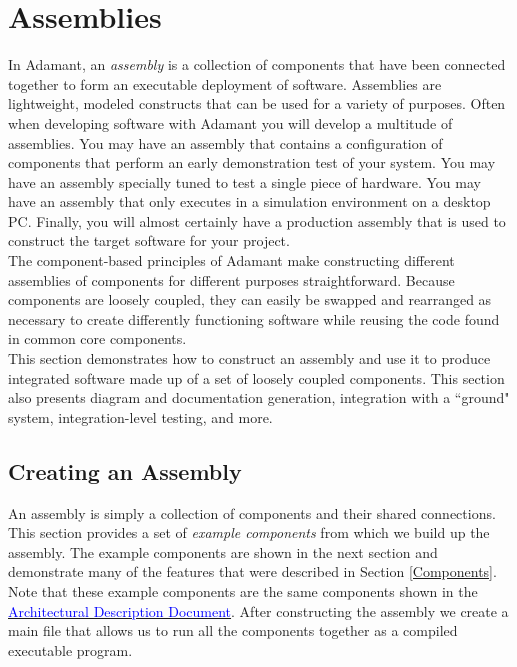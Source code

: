 \newpage
\section{Assemblies} \label{Assemblies}

In Adamant, an \textit{assembly} is a collection of components that have been connected together to form an executable deployment of software. Assemblies are lightweight, modeled constructs that can be used for a variety of purposes. Often when developing software with Adamant you will develop a multitude of assemblies. You may have an assembly that contains a configuration of components that perform an early demonstration test of your system. You may have an assembly specially tuned to test a single piece of hardware. You may have an assembly that only executes in a simulation environment on a desktop PC. Finally, you will almost certainly have a production assembly that is used to construct the target software for your project. \\

The component-based principles of Adamant make constructing different assemblies of components for different purposes straightforward. Because components are loosely coupled, they can easily be swapped and rearranged as necessary to create differently functioning software while reusing the code found in common core components. \\

This section demonstrates how to construct an assembly and use it to produce integrated software made up of a set of loosely coupled components. This section also presents diagram and documentation generation, integration with a ``ground" system, integration-level testing, and more.

\subsection{Creating an Assembly}

An assembly is simply a collection of components and their shared connections. This section provides a set of \textit{example components} from which we build up the assembly. The example components are shown in the next section and demonstrate many of the features that were described in Section \ref{Components}. Note that these example components are the same components shown in the \href{https://github.com/lasp/adamant/blob/main/doc/architecture_description_document/architecture_description_document.pdf}{\textcolor{blue}{Architectural Description Document}}. After constructing the assembly we create a main file that allows us to run all the components together as a compiled executable program.

